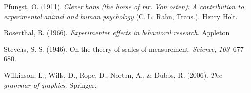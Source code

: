 \documentclass[
  letterpaper,
]{book}
\newlength{\cslhangindent}
\newlength{\cslentryspacingunit} %
\newenvironment{CSLReferences}[2] %
 {%
  \setlength{\parindent}{0pt}
  \ifodd #1
  \let\oldpar\par
  \def\par{\hangindent=\cslhangindent\oldpar}
  \fi
  \setlength{\parskip}{#2\cslentryspacingunit}
 }%
 {}
\begin{document}
\begin{CSLReferences}{1}{0}
\leavevmode{}%
Pfungst, O. (1911). \emph{Clever hans (the horse of mr. Von osten): A
contribution to experimental animal and human psychology} (C. L. Rahn,
Trans.). Henry Holt.

\leavevmode{}%
Rosenthal, R. (1966). \emph{Experimenter effects in behavioral
research}. Appleton.

\leavevmode{}%
Stevens, S. S. (1946). On the theory of scales of measurement.
\emph{Science}, \emph{103}, 677--680.

\leavevmode{}%
Wilkinson, L., Wills, D., Rope, D., Norton, A., \& Dubbs, R. (2006).
\emph{The grammar of graphics}. Springer.

\end{CSLReferences}
\end{document}
